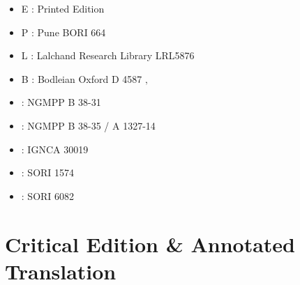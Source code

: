 \begin{itemize}
\item E : Printed Edition
\item P : Pune BORI 664
\item L : Lalchand Research Library LRL5876
\item B : Bodleian Oxford D 4587
‚\item \None : NGMPP B 38-31
\item \Ntwo : NGMPP B 38-35 / A 1327-14
\item \Done : IGNCA 30019
\item \Uone : SORI 1574
\item \Utwo: SORI 6082
\end{itemize}

\chapter{Critical Edition \& Annotated Translation}
\cleardoublepage 
